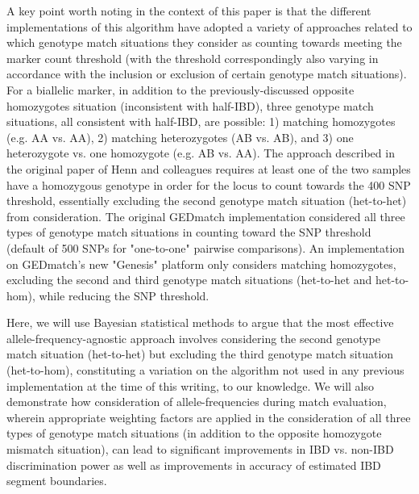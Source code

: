 \documentclass{article}
\begin{document}
A key point worth noting in the context of this paper is that the different implementations of this algorithm have adopted a variety of approaches related to which genotype match situations they consider as counting towards meeting the marker count threshold (with the threshold correspondingly also varying in accordance with the inclusion or exclusion of certain genotype match situations). For a biallelic marker, in addition to the previously-discussed opposite homozygotes situation (inconsistent with half-IBD), three genotype match situations, all consistent with half-IBD, are possible: 1) matching homozygotes (e.g. AA vs. AA), 2) matching heterozygotes (AB vs. AB), and 3) one heterozygote vs. one homozygote (e.g. AB vs. AA). The approach described in the original paper of Henn and colleagues requires at least one of the two samples have a homozygous genotype in order for the locus to count towards the 400 SNP threshold, essentially excluding the second genotype match situation (het-to-het) from consideration. The original GEDmatch implementation considered all three types of genotype match situations in counting toward the SNP threshold (default of 500 SNPs for "one-to-one" pairwise comparisons). An implementation on GEDmatch's new "Genesis" platform only considers matching homozygotes, excluding the second and third genotype match situations (het-to-het and het-to-hom), while reducing the SNP threshold.

Here, we will use Bayesian statistical methods to argue that the most effective allele-frequency-agnostic approach involves considering the second genotype match situation (het-to-het) but excluding the third genotype match situation (het-to-hom), constituting a variation on the algorithm not used in any previous implementation at the time of this writing, to our knowledge. We will also demonstrate how consideration of allele-frequencies during match evaluation, wherein appropriate weighting factors are applied in the consideration of all three types of genotype match situations (in addition to the opposite homozygote mismatch situation), can lead to significant improvements in IBD vs. non-IBD discrimination power as well as improvements in accuracy of estimated IBD segment boundaries.
\end{document}
